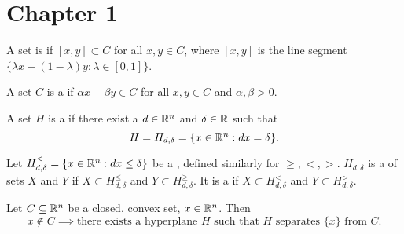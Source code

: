 \documentclass{exam}
\begin{document}
    \section{Chapter 1}\label{sec:chapter1}
    
    \begin{define}
        A set is  if $[x,y] \subset C$ for all $x,y \in C$, where $[x,y]$ is the line segment $\{ \lambda x + (1-\lambda)y : \lambda \in [0,1] \}$.
    \end{define}
    \begin{define}
        A set $C$ is a  if $\alpha x + \beta y \in C$ for all $x,y \in C$ and $\alpha, \beta >0$.
    \end{define}
    \begin{define}
        A set $H$ is a  if there exist a $d \in \mathbb{R}^n$ and $\delta \in \mathbb{R}$ such that
        \[
            H = H_{d, \delta} = \{ x \in \mathbb{R}^n : d x = \delta \}.
        \]
    \end{define}
    \begin{define}
        Let $H_{d,\delta}^{\le} = \{ x \in \mathbb{R}^n : dx \le \delta \}$ be a , defined similarly for $\ge, <, >$.
        $H_{d, \delta}$ is a  of sets $X$ and $Y$ if $X \subset H_{d,\delta}^\le$ and $Y \subset H_{d,\delta}^\ge$.
        It is a  if $X \subset H_{d,\delta}^<$ and $Y \subset H_{d,\delta}^>$.
    \end{define}
    \begin{theorem}
        Let $C \subseteq \mathbb{R}^n$ be a closed, convex set, $x \in \mathbb{R}^n$.
        Then
        \[
            x \not \in C \implies \text{there exists a hyperplane $H$ such that $H$ separates $\{x\}$ from $C$}.
        \]
    \end{theorem}
\end{document}
